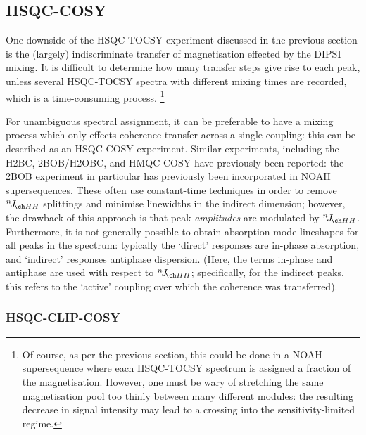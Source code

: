 \subsection{HSQC-COSY}
\label{subsec:noah__hsqccosy}

One downside of the HSQC-TOCSY experiment discussed in the previous section is the (largely) indiscriminate transfer of magnetisation effected by the DIPSI mixing.
It is difficult to determine how many transfer steps give rise to each peak, unless several HSQC-TOCSY spectra with different mixing times are recorded, which is a time-consuming process.%
\footnote{Of course, as per the previous section, this could be done in a NOAH supersequence where each HSQC-TOCSY spectrum is assigned a fraction of the  magnetisation. However, one must be wary of stretching the same magnetisation pool too thinly between many different modules: the resulting decrease in signal intensity may lead to a crossing into the sensitivity-limited regime.}

For unambiguous spectral assignment, it can be preferable to have a mixing process which only effects coherence transfer across a single coupling: this can be described as an HSQC-COSY experiment.
Similar experiments, including the H2BC\autocite{Nyberg2005JACS,Nyberg2005MRC}, 2BOB/H2OBC\autocite{Kupce2017MRC}, and HMQC-COSY\autocite{Hu2011JBNMR} have previously been reported: the 2BOB experiment in particular has previously been incorporated in NOAH supersequences\autocite{Kupce2019JMR}.
These often use constant-time techniques in order to remove $\nJ{HH}$ splittings and minimise linewidths in the indirect dimension; however, the drawback of this approach is that peak \textit{amplitudes} are modulated by $\nJ{HH}$.
Furthermore, it is not generally possible to obtain absorption-mode lineshapes for all peaks in the spectrum: typically the `direct' responses are in-phase absorption, and `indirect' responses antiphase dispersion.
(Here, the terms in-phase and antiphase are used with respect to $\nJ{HH}$; specifically, for the indirect peaks, this refers to the `active' coupling over which the coherence was transferred).


\subsubsection{HSQC-CLIP-COSY}

